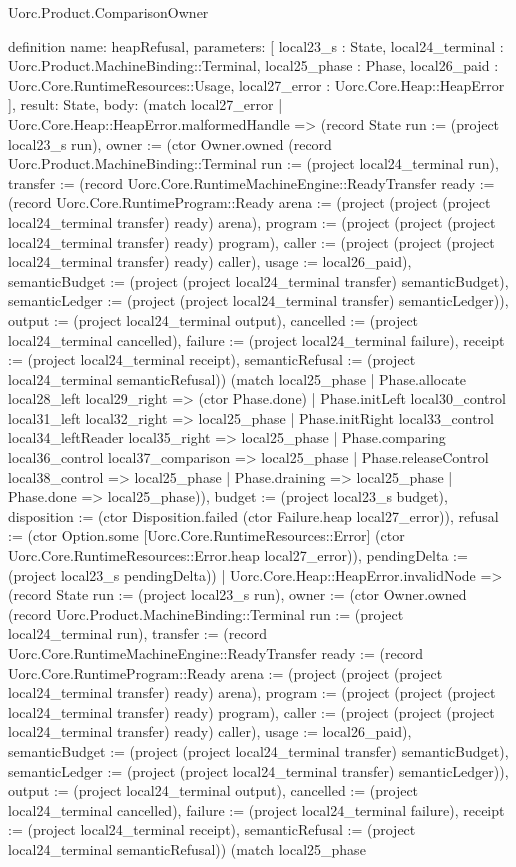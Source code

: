 \begin{lexlean}{Uorc.Product.ComparisonOwner}
\begin{semanticmodule}
definition{
  name: heapRefusal,
  parameters: [
    local23_s : State,
    local24_terminal : Uorc.Product.MachineBinding::Terminal,
    local25_phase : Phase,
    local26_paid : Uorc.Core.RuntimeResources::Usage,
    local27_error : Uorc.Core.Heap::HeapError
  ],
  result: State,
  body: (match local27_error
    | Uorc.Core.Heap::HeapError.malformedHandle => (record State {run := (project local23_s run), owner := (ctor Owner.owned (record Uorc.Product.MachineBinding::Terminal {run := (project local24_terminal run), transfer := (record Uorc.Core.RuntimeMachineEngine::ReadyTransfer {ready := (record Uorc.Core.RuntimeProgram::Ready {arena := (project (project (project local24_terminal transfer) ready) arena), program := (project (project (project local24_terminal transfer) ready) program), caller := (project (project (project local24_terminal transfer) ready) caller), usage := local26_paid}), semanticBudget := (project (project local24_terminal transfer) semanticBudget), semanticLedger := (project (project local24_terminal transfer) semanticLedger)}), output := (project local24_terminal output), cancelled := (project local24_terminal cancelled), failure := (project local24_terminal failure), receipt := (project local24_terminal receipt), semanticRefusal := (project local24_terminal semanticRefusal)}) (match local25_phase
      | Phase.allocate local28_left local29_right => (ctor Phase.done)
      | Phase.initLeft local30_control local31_left local32_right => local25_phase
      | Phase.initRight local33_control local34_leftReader local35_right => local25_phase
      | Phase.comparing local36_control local37_comparison => local25_phase
      | Phase.releaseControl local38_control => local25_phase
      | Phase.draining => local25_phase
      | Phase.done => local25_phase)), budget := (project local23_s budget), disposition := (ctor Disposition.failed (ctor Failure.heap local27_error)), refusal := (ctor Option.some [Uorc.Core.RuntimeResources::Error] (ctor Uorc.Core.RuntimeResources::Error.heap local27_error)), pendingDelta := (project local23_s pendingDelta)})
    | Uorc.Core.Heap::HeapError.invalidNode => (record State {run := (project local23_s run), owner := (ctor Owner.owned (record Uorc.Product.MachineBinding::Terminal {run := (project local24_terminal run), transfer := (record Uorc.Core.RuntimeMachineEngine::ReadyTransfer {ready := (record Uorc.Core.RuntimeProgram::Ready {arena := (project (project (project local24_terminal transfer) ready) arena), program := (project (project (project local24_terminal transfer) ready) program), caller := (project (project (project local24_terminal transfer) ready) caller), usage := local26_paid}), semanticBudget := (project (project local24_terminal transfer) semanticBudget), semanticLedger := (project (project local24_terminal transfer) semanticLedger)}), output := (project local24_terminal output), cancelled := (project local24_terminal cancelled), failure := (project local24_terminal failure), receipt := (project local24_terminal receipt), semanticRefusal := (project local24_terminal semanticRefusal)}) (match local25_phase
}}
\end{semanticmodule}
\end{lexlean}
